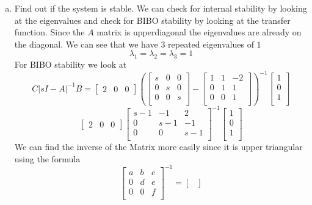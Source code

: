\documentclass{article}
\begin{document}
\begin{enumerate}[a.]
\item Find out if the system is stable.
\newline
We can check for internal stability by looking at the eigenvalues and check for BIBO stability by looking at the transfer function.
\newline
Since the $A$ matrix is upperdiagonal the eigenvalues are already on the diagonal.
We can see that we have 3 repeated eigenvalues of $1$
$$ \lambda_1 = \lambda_2 = \lambda_3 = 1 $$
For BIBO stability we look at
$$
C|sI-A|^{-1}B =
\begin{bmatrix} 2 & 0 & 0 \end{bmatrix}
(
\begin{bmatrix}
s & 0 & 0 \\
0 & s & 0 \\
0 & 0 & s \\
\end{bmatrix}
-
\begin{bmatrix}
1 & 1 & -2 \\
0 & 1 &  1 \\
0 & 0 &  1 \\
\end{bmatrix}
)^{-1}
\begin{bmatrix}
1 \\
0 \\
1 \\
\end{bmatrix}
$$
$$
\begin{bmatrix} 2 & 0 & 0 \end{bmatrix}
\begin{bmatrix}
s-1 & -1 & 2 \\
0 & s-1 &  -1 \\
0 & 0 &  s-1 \\
\end{bmatrix}
^{-1}
\begin{bmatrix}
1 \\
0 \\
1 \\
\end{bmatrix}
$$
We can find the inverse of the Matrix more easily since it is upper triangular using the formula
$$
\begin{bmatrix}
a & b & c \\
0 & d & e \\
0 & 0 & f \\
\end{bmatrix}
^{-1}
=
\begin{bmatrix}

\end{bmatrix}$$
\end{enumerate}
\end{document}
